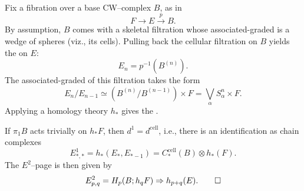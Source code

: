 \begin{definition}
Fix a fibration over a base CW--complex $B$, as in \[F \to E \xrightarrow p B.\]
By assumption, $B$ comes with a skeletal filtration whose associated-graded is a wedge of spheres (viz., its cells).
Pulling back the cellular filtration on $B$ yields the  on $E$: \[E_n = p^{-1}(B^{(n)}).\]
The associated-graded of this filtration takes the form \[E_n / E_{n-1} \simeq (B^{(n)} / B^{(n-1)}) \times F = \bigvee_\alpha S^n_\alpha \times F.\]
Applying a homology theory $h_*$ gives the .
\end{definition}

\begin{theorem}[Serre]
If $\pi_1 B$ acts trivially on $h_* F$,%
then $d^1 = d^{\mathrm{cell}}$, i.e., there is an identification as chain complexes \[E^1_{*, *} = h_*(E_*, E_{*-1}) = C^{\mathrm{cell}}_*(B) \otimes h_*(F).\]
The $E^2$--page is then given by \[E^2_{p, q} = H_p(B; h_q F) \Rightarrow h_{p+q}(E). \qed\]
\end{theorem}

